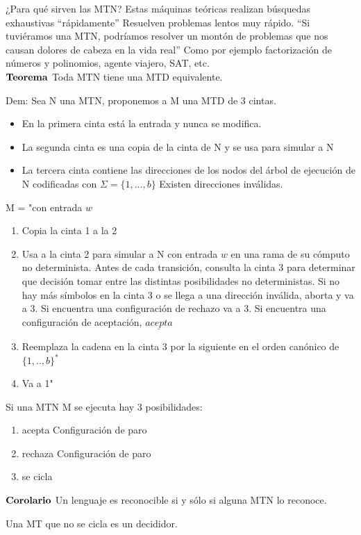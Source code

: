 \documentclass{homework}
\begin{document}
¿Para qué sirven las MTN?
Estas máquinas teóricas realizan búsquedas exhaustivas “rápidamente”
Resuelven problemas lentos muy rápido.
“Si tuviéramos una MTN, podríamos resolver un montón de problemas que nos causan dolores de cabeza en la vida real”
Como por ejemplo factorización de números y polinomios, agente viajero, SAT, etc.\\


$\bf{Teorema}$ Toda MTN tiene una MTD equivalente.

Dem: Sea N una MTN, proponemos a M una MTD de 3 cintas.
\begin{itemize}
	\item En la primera cinta está la entrada y nunca se modifica.
	\item La segunda cinta es una copia de la cinta de N y se usa para simular a N
	\item La tercera cinta contiene las direcciones de los nodos del árbol de ejecución de N codificadas con $\Sigma = \{1, ..., b\}$ Existen direcciones inválidas.
\end{itemize}

M = "con entrada $w$
\begin{enumerate}
	\item Copia la cinta 1 a la 2
	\item Usa a la cinta 2 para simular a N con entrada $w$ en una rama de su cómputo no determinista.
	Antes de cada transición, consulta la cinta 3 para determinar que decisión tomar entre las distintas posibilidades no deterministas. Si no hay más símbolos en la cinta 3 o se llega a una dirección inválida, aborta y va a 3. Si encuentra una configuración de rechazo va a 3. Si encuentra una configuración de aceptación, $\underline{acepta}$
	\item Reemplaza la cadena en la cinta 3 por la siguiente en el orden canónico de $\{1,..,b\}^{*}$
	\item Va a 1"
\end{enumerate}

Si una MTN M se ejecuta hay 3 posibilidades:
\begin{enumerate}
	\item acepta Configuración de paro
	\item rechaza Configuración de paro
	\item se cicla
\end{enumerate}

$\bf{Corolario}$ Un lenguaje es reconocible si y sólo si alguna MTN lo reconoce.

Una MT que no se cicla es un decididor.
\end{document}
